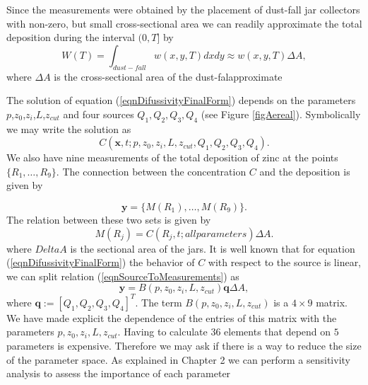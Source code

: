 \documentclass[12pt]{book}
\newcommand{\x}{\textbf{x}}
\newcommand{\y}{\textbf{y}}
\begin{document}
Since the measurements were obtained by the placement of dust-fall jar collectors with non-zero, but small 
cross-sectional area
we can readily approximate the total deposition during the interval $(0,T]$ by
\begin{equation*}
W(T)=\int_{dust-fall}w(x,y,T)dxdy\approx w(x,y,T)\Delta A,
\end{equation*}
where $\Delta A$ is the cross-sectional area of the dust-falapproximate





The solution of equation (\ref{eqnDifussivityFinalForm}) depends on the
parameters $p$,$z_{0}$,$z_{i}$,$L$,$z_{cut}$ and four sources $Q_{1},
Q_{2},Q_{3},Q_{4}$ (see Figure \ref{figAereal}).  Symbolically we may
write the solution as
\begin{equation*}
C(\x,t;p,z_{0},z_{i},L,z_{cut},Q_{1},Q_{2},Q_{3},Q_{4}).
\end{equation*}
We also have nine measurements of the total deposition of zinc at the points $\{R_{1},\ldots, R_{9}\}$.
The connection between the concentration $C$ and the deposition is given by 


\begin{equation}
\y=\{M(R_{1}),\ldots,M(R_{9})\}.
\end{equation}
The relation between these two sets is given by
\begin{equation}\label{eqnSourceToMeasurements}
M(R_{j})=C(R_{j},t;allparameters)\Delta A.
\end{equation}
where $Delta A$ is the sectional area of the jars. It is well known that for equation (\ref{eqnDifussivityFinalForm}) the behavior of $C$ 
with respect to the source is linear, we can split relation (\ref{eqnSourceToMeasurements}) as
\begin{equation*}
\y= B(p,z_{0},z_{i},L,z_{cut})\textbf{q}\Delta A,
\end{equation*}
where $\textbf{q}:=[Q_{1},Q_{2},Q_{3},Q_{4}]^{T}$. The term $B(p,z_{0},z_{i},L,z_{cut})$ is a $4\times 9$ matrix. We have made explicit
the dependence of the entries of this matrix with the parameters $p,z_{0},z_{i},L,z_{cut}$. Having to calculate 36 elements 
that depend on $5$ parameters is expensive. Therefore we may ask if there is a way to reduce the size of the parameter space.
As explained in Chapter 2 we can perform a sensitivity analysis to assess the importance of each parameter
\end{document}

